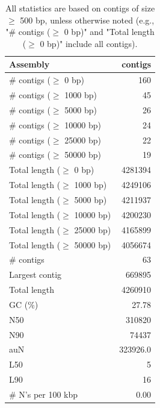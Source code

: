 \documentclass[12pt,a4paper]{article}
\begin{document}
\begin{table}[ht]
\begin{center}
\caption{All statistics are based on contigs of size $\geq$ 500 bp, unless otherwise noted (e.g., "\# contigs ($\geq$ 0 bp)" and "Total length ($\geq$ 0 bp)" include all contigs).}
\begin{tabular}{|l*{1}{|r}|}
\hline
Assembly & contigs \\ \hline
\# contigs ($\geq$ 0 bp) & 160 \\ \hline
\# contigs ($\geq$ 1000 bp) & 45 \\ \hline
\# contigs ($\geq$ 5000 bp) & 26 \\ \hline
\# contigs ($\geq$ 10000 bp) & 24 \\ \hline
\# contigs ($\geq$ 25000 bp) & 22 \\ \hline
\# contigs ($\geq$ 50000 bp) & 19 \\ \hline
Total length ($\geq$ 0 bp) & 4281394 \\ \hline
Total length ($\geq$ 1000 bp) & 4249106 \\ \hline
Total length ($\geq$ 5000 bp) & 4211937 \\ \hline
Total length ($\geq$ 10000 bp) & 4200230 \\ \hline
Total length ($\geq$ 25000 bp) & 4165899 \\ \hline
Total length ($\geq$ 50000 bp) & 4056674 \\ \hline
\# contigs & 63 \\ \hline
Largest contig & 669895 \\ \hline
Total length & 4260910 \\ \hline
GC (\%) & 27.78 \\ \hline
N50 & 310820 \\ \hline
N90 & 74437 \\ \hline
auN & 323926.0 \\ \hline
L50 & 5 \\ \hline
L90 & 16 \\ \hline
\# N's per 100 kbp & 0.00 \\ \hline
\end{tabular}
\end{center}
\end{table}
\end{document}
